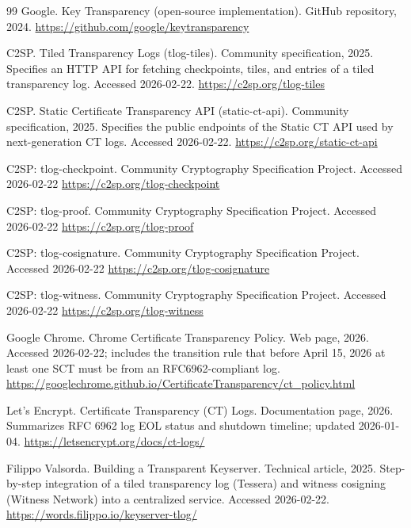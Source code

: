 \documentclass[11pt]{article}
\begin{document}
\begin{thebibliography}{99}
{Google}.
\newblock Key Transparency (open-source implementation).
\newblock GitHub repository, 2024.
\newblock \url{https://github.com/google/keytransparency}

{C2SP}.
\newblock Tiled Transparency Logs (tlog-tiles).
\newblock Community specification, 2025.
\newblock Specifies an HTTP API for fetching checkpoints, tiles, and entries of a tiled transparency log. Accessed 2026-02-22.
\newblock \url{https://c2sp.org/tlog-tiles}

{C2SP}.
\newblock Static Certificate Transparency API (static-ct-api).
\newblock Community specification, 2025.
\newblock Specifies the public endpoints of the Static CT API used by next-generation CT logs. Accessed 2026-02-22.
\newblock \url{https://c2sp.org/static-ct-api}

\newblock C2SP: tlog-checkpoint.
\newblock Community Cryptography Specification Project.
\newblock Accessed 2026-02-22
\newblock \url{https://c2sp.org/tlog-checkpoint}

\newblock C2SP: tlog-proof.
\newblock Community Cryptography Specification Project.
\newblock Accessed 2026-02-22
\newblock \url{https://c2sp.org/tlog-proof}

\newblock C2SP: tlog-cosignature.
\newblock Community Cryptography Specification Project.
\newblock Accessed 2026-02-22
\newblock \url{https://c2sp.org/tlog-cosignature}

\newblock C2SP: tlog-witness.
\newblock Community Cryptography Specification Project.
\newblock Accessed 2026-02-22
\newblock \url{https://c2sp.org/tlog-witness}

{Google Chrome}.
\newblock Chrome Certificate Transparency Policy.
\newblock Web page, 2026.
\newblock Accessed 2026-02-22; includes the transition rule that before April 15, 2026 at least one SCT must be from an RFC6962-compliant log.
\newblock \url{https://googlechrome.github.io/CertificateTransparency/ct_policy.html}

{Let's Encrypt}.
\newblock Certificate Transparency (CT) Logs.
\newblock Documentation page, 2026.
\newblock Summarizes RFC 6962 log EOL status and shutdown timeline; updated 2026-01-04.
\newblock \url{https://letsencrypt.org/docs/ct-logs/}

Filippo Valsorda.
\newblock Building a Transparent Keyserver.
\newblock Technical article, 2025.
\newblock Step-by-step integration of a tiled transparency log (Tessera) and witness cosigning (Witness Network) into a centralized service. Accessed 2026-02-22.
\newblock \url{https://words.filippo.io/keyserver-tlog/}


\end{thebibliography}
\end{document}
